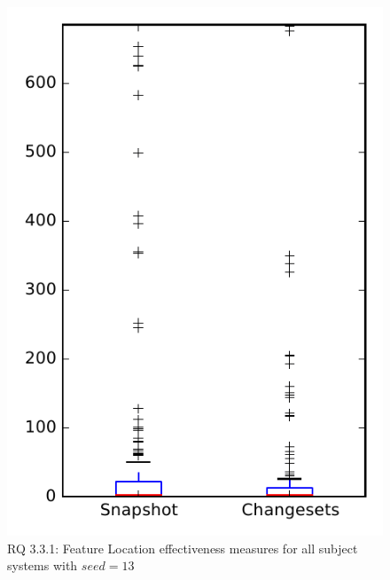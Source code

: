 
\begin{figure}
\centering
\includegraphics[height=0.4\textheight]{figures/flt_seed/rq1_overview_13}
\caption{RQ 3.3.1: Feature Location effectiveness measures for all subject systems with $seed=13$}
\label{fig:flt_seed:rq1:overview}
\end{figure}
